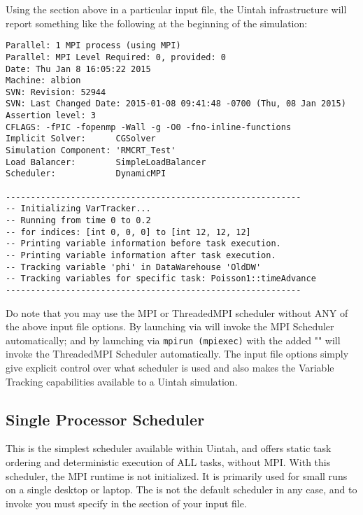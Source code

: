 \noindent Using the  section above in a particular input file,
the Uintah infrastructure will report something like the following at the
beginning of the simulation:

\begin{Verbatim}[fontsize=\footnotesize]
Parallel: 1 MPI process (using MPI)
Parallel: MPI Level Required: 0, provided: 0
Date: Thu Jan 8 16:05:22 2015
Machine: albion
SVN: Revision: 52944
SVN: Last Changed Date: 2015-01-08 09:41:48 -0700 (Thu, 08 Jan 2015)
Assertion level: 3
CFLAGS: -fPIC -fopenmp -Wall -g -O0 -fno-inline-functions
Implicit Solver:      CGSolver
Simulation Component: 'RMCRT_Test'
Load Balancer:        SimpleLoadBalancer
Scheduler:            DynamicMPI

-----------------------------------------------------------
-- Initializing VarTracker...
-- Running from time 0 to 0.2
-- for indices: [int 0, 0, 0] to [int 12, 12, 12]
-- Printing variable information before task execution.
-- Printing variable information after task execution.
-- Tracking variable 'phi' in DataWarehouse 'OldDW'
-- Tracking variables for specific task: Poisson1::timeAdvance
-----------------------------------------------------------
\end{Verbatim}

Do note that you may use the MPI or ThreadedMPI scheduler without ANY of the 
above input file options. By launching  via  will 
invoke the MPI Scheduler automatically; and by launching  via 
\texttt{mpirun (mpiexec)} with the added "" will invoke the 
ThreadedMPI Scheduler automatically. The input file options simply give 
explicit control over what scheduler is used and also makes the Variable 
Tracking capabilities available to a Uintah simulation.


\subsection{Single Processor Scheduler} \label{Sec:SingleProcessorScheduler}
This is the simplest scheduler available within Uintah, and offers static task
ordering and deterministic execution of ALL tasks, without MPI. With this
scheduler, the MPI runtime is not initialized. It is primarily used for small
runs on a single desktop or laptop. The  is not
the default scheduler in any case, and to invoke you must specify
 in the  section of your input file.


